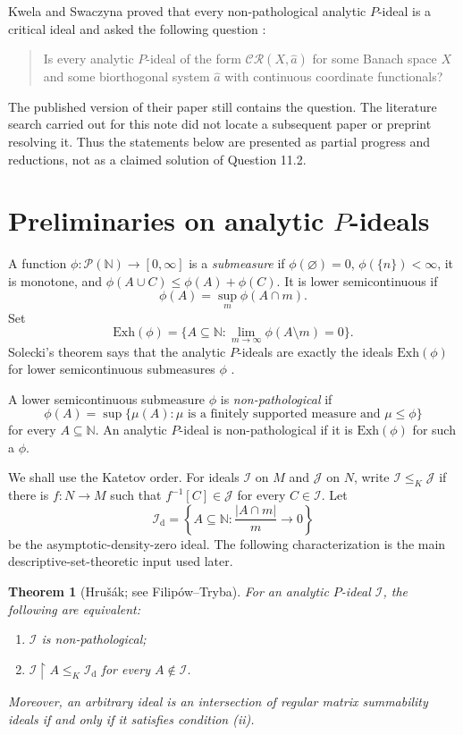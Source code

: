 \documentclass[11pt]{article}
\newtheorem{theorem}{Theorem}[section]
\theoremstyle{definition}
\theoremstyle{remark}
\newcommand{\N}{\mathbb N}
\newcommand{\cP}{\mathcal P}
\newcommand{\I}{\mathcal I}
\newcommand{\J}{\mathcal J}
\newcommand{\CR}{\mathcal{CR}}
\newcommand{\Exh}{\mathrm{Exh}}
\newcommand{\Id}{\mathcal I_{\mathrm d}}
\newcommand{\restr}{\mathbin{\upharpoonright}}
\begin{document}
Kwela and Swaczyna proved that every non-pathological analytic $P$-ideal is a
critical ideal and asked the following question \cite[Question 11.2]{KS}:
\begin{quote}
Is every analytic $P$-ideal of the form $\CR(X,\widehat a)$ for some Banach
space $X$ and some biorthogonal system $\widehat a$ with continuous coordinate
functionals?
\end{quote}
The published version of their paper still contains the question.  The
literature search carried out for this note did not locate a subsequent paper
or preprint resolving it.  Thus the statements below are presented as partial
progress and reductions, not as a claimed solution of Question 11.2.

\section{Preliminaries on analytic $P$-ideals}

A function $\phi:\cP(\N)\to[0,\infty]$ is a \emph{submeasure} if
$\phi(\varnothing)=0$, $\phi(\{n\})<\infty$, it is monotone, and
$\phi(A\cup C)\leq\phi(A)+\phi(C)$.  It is lower semicontinuous if
\[
 \phi(A)=\sup_m\phi(A\cap m).
\]
Set
\[
 \Exh(\phi)=
 \{A\subseteq\N:\lim_{m\to\infty}\phi(A\setminus m)=0\}.
\]
Solecki's theorem says that the analytic $P$-ideals are exactly the ideals
$\Exh(\phi)$ for lower semicontinuous submeasures $\phi$ \cite{Solecki}.

A lower semicontinuous submeasure $\phi$ is \emph{non-pathological} if
\begin{equation}\label{eq:nonpath-submeasure}
 \phi(A)=\sup\{\mu(A):\mu\text{ is a finitely supported measure and }
                         \mu\leq\phi\}
\end{equation}
for every $A\subseteq\N$.  An analytic $P$-ideal is non-pathological if it is
$\Exh(\phi)$ for such a $\phi$.

We shall use the Katetov order.  For ideals $\I$ on $M$ and $\J$ on $N$, write
$\I\leq_K\J$ if there is $f:N\to M$ such that $f^{-1}[C]\in\J$ for every
$C\in\I$.  Let
\[
 \Id=\left\{A\subseteq\N:\frac{|A\cap m|}{m}\longrightarrow0\right\}
\]
be the asymptotic-density-zero ideal.  The following characterization is the
main descriptive-set-theoretic input used later.

\begin{theorem}[Hru\v{s}\'ak; see Filip\'ow--Tryba]\label{thm:hrusak}
For an analytic $P$-ideal $\I$, the following are equivalent:
\begin{enumerate}[label=(\roman*)]
 \item $\I$ is non-pathological;
 \item $\I\restr A\leq_K\Id$ for every $A\notin\I$.
\end{enumerate}
Moreover, an arbitrary ideal is an intersection of regular matrix summability
ideals if and only if it satisfies condition \emph{(ii)}.
\end{theorem}
\end{document}
